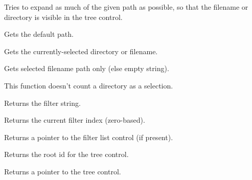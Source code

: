 Tries to expand as much of the given path as possible, so that the filename or directory is visible in the tree control.

\label{wxgenericdirctrlgetdefaultpath}


Gets the default path.

\label{wxgenericdirctrlgetpath}


Gets the currently-selected directory or filename.

\label{wxgenericdirctrlgetfilepath}


Gets selected filename path only (else empty string).

This function doesn't count a directory as a selection.

\label{wxgenericdirctrlgetfilter}


Returns the filter string.

\label{wxgenericdirctrlgetfilterindex}


Returns the current filter index (zero-based).

\label{wxgenericdirctrlgetfilterlistctrl}


Returns a pointer to the filter list control (if present).

\label{wxgenericdirctrlgetrootid}


Returns the root id for the tree control.

\label{wxgenericdirctrlgettreectrl}


Returns a pointer to the tree control.

\label{wxgenericdirctrlsetdefaultpath}

